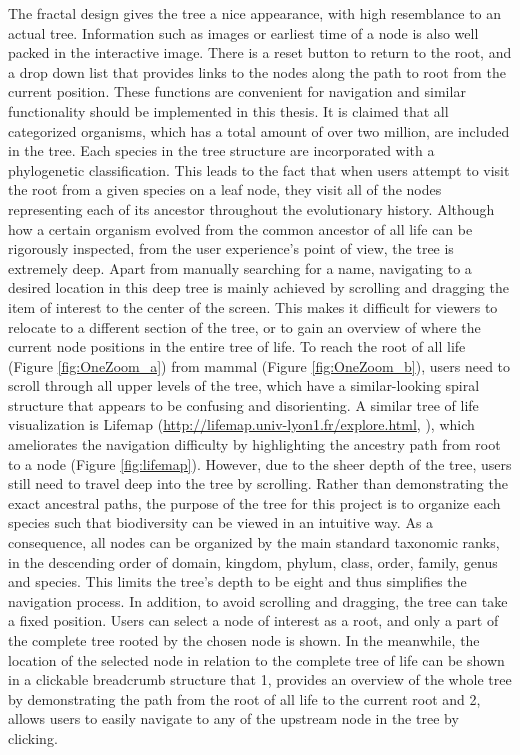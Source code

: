 \documentclass[11pt, a4paper,oneside,chapterprefix=false]{scrbook}
\begin{document}
The fractal design gives the tree a nice appearance, with high resemblance to an actual tree. Information such as images or earliest time of a node is also well packed in the interactive image. There is a reset button to return to the root, and a drop down list that provides links to the nodes along the path to root from the current position. These functions are convenient for navigation and similar functionality should be implemented in this thesis. It is claimed that all categorized organisms, which has a total amount of over two million, are included in the tree. Each species in the tree structure are incorporated with a phylogenetic classification. This leads to the fact that when users attempt to visit the root from a given species on a leaf node, they visit all of the nodes representing each of its ancestor throughout the evolutionary history. Although how a certain organism evolved from the common ancestor of all life can be rigorously inspected, from the user experience's point of view, the tree is extremely deep. Apart from manually searching for a name, navigating to a desired location in this deep tree is mainly achieved by scrolling and dragging the item of interest to the center of the screen. This makes it difficult for viewers to relocate to a different section of the tree, or to gain an overview of where the current node positions in the entire tree of life. To reach the root of all life (Figure \ref{fig:OneZoom_a}) from mammal (Figure \ref{fig:OneZoom_b}), users need to scroll through all upper levels of the tree, which have a similar-looking spiral structure that appears to be confusing and disorienting. A similar tree of life visualization is Lifemap (\url{http://lifemap.univ-lyon1.fr/explore.html}, \cite{de2016lifemap}), which ameliorates the navigation difficulty by highlighting the ancestry path from root to a node (Figure \ref{fig:lifemap}). However, due to the sheer depth of the tree, users still need to travel deep into the tree by scrolling. Rather than demonstrating the exact ancestral paths, the purpose of the tree for this project is to organize each species such that biodiversity can be viewed in an intuitive way. As a consequence, all nodes can be organized by the main standard taxonomic ranks, in the descending order of domain, kingdom, phylum, class, order, family, genus and species. This limits the tree's depth to be eight and thus simplifies the navigation process. In addition, to avoid scrolling and dragging, the tree can take a fixed position. Users can select a node of interest as a root, and only a part of the complete tree rooted by the chosen node is shown. In the meanwhile, the location of the selected node in relation to the complete tree of life can be shown in a clickable breadcrumb structure that 1, provides an overview of the whole tree by demonstrating the path from the root of all life to the current root and 2, allows users to easily navigate to any of the upstream node in the tree by clicking. \\
\end{document}
